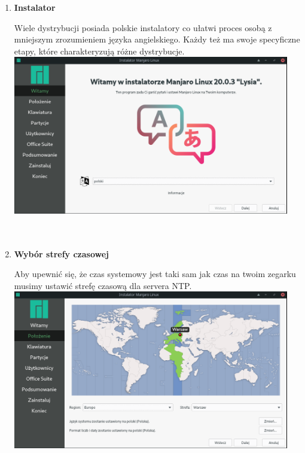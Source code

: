 \documentclass[10pt,a4paper]{report}
\begin{document}
\begin{enumerate}
\item \textbf{Instalator} \par
Wiele dystrybucji posiada polskie instalatory co ułatwi proces osobą z mniejszym zrozumieniem języka angielskiego. Każdy też ma swoje specyficzne etapy, które charakteryzują różne dystrybucje.\\

\includegraphics[width=0.95\textwidth, center]{manjaro_install3.png}\\\\\\

\item \textbf{Wybór strefy czasowej} \par
Aby upewnić się, że czas systemowy jest taki sam jak czas na twoim zegarku musimy ustawić strefę czasową dla servera NTP.\\

\includegraphics[width=0.95\textwidth, center]{manjaro_install4.png}\\\\\\




\end{enumerate}
\end{document}
